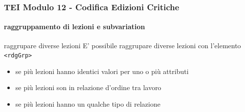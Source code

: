 











\begin{frame}
    \frametitle{TEI Modulo 12 - Codifica Edizioni Critiche}
    \framesubtitle{raggruppamento di lezioni e subvariation}
    \addtocounter{nframe}{1}




    \begin{block}{raggrupare diverse lezioni}
        E' possibile raggrupare diverse lezioni con l'elemento \texttt{<rdgGrp>}
    \end{block}

    \begin{itemize}
        \item se più lezioni hanno identici valori per uno o più attributi
        \item se più lezioni son in relazione d'ordine tra lavoro
        \item se più lezioni hanno un qualche tipo di relazione
    \end{itemize}

\end{frame}




